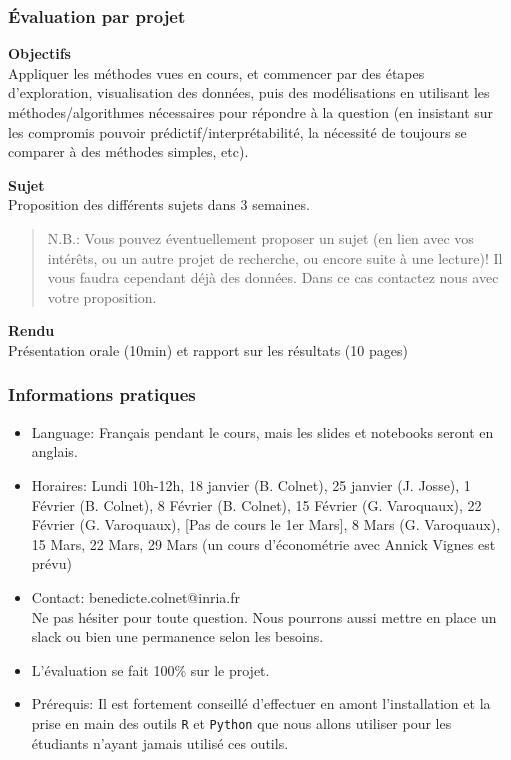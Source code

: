 \documentclass[10pt]{beamer}
\begin{document}
\frame
{ \frametitle{Évaluation par projet}

\textbf{Objectifs}\\
Appliquer les méthodes vues en cours, et commencer par des étapes d’exploration, visualisation des données, puis des modélisations en utilisant les méthodes/algorithmes nécessaires pour répondre à la question (en insistant sur les compromis pouvoir prédictif/interprétabilité, la nécessité de toujours se comparer à des méthodes simples, etc). 

\textbf{Sujet}\\
Proposition des différents sujets dans 3 semaines. 

\begin{quote}
N.B.: Vous pouvez éventuellement proposer un sujet (en lien avec vos intérêts, ou un autre projet de recherche, ou encore suite à une lecture)! Il vous faudra cependant déjà des données. Dans ce cas contactez nous avec votre proposition.
\end{quote}


\textbf{Rendu}\\
Présentation orale (10min) et rapport sur les résultats (10 pages)

}


\frame
{ \frametitle{Informations pratiques}

\begin{itemize}

\item Language: Français pendant le cours, mais les slides et notebooks seront en anglais.
\item Horaires: Lundi 10h-12h, 18 janvier (B. Colnet), 25 janvier (J. Josse), 1 Février (B. Colnet), 8 Février (B. Colnet),  15 Février (G. Varoquaux), 22 Février (G. Varoquaux), [Pas de cours le 1er Mars], 8 Mars (G. Varoquaux), 15 Mars, 22 Mars, 29 Mars (un cours d'économétrie avec Annick Vignes est prévu)
\item Contact: benedicte.colnet@inria.fr \\ Ne pas hésiter pour toute question. Nous pourrons aussi mettre en place un slack ou bien une permanence selon les besoins. 
\vfill

\item L'évaluation se fait 100\% sur le projet. 

\item Prérequis: Il est fortement conseillé d'effectuer en amont l'installation et la prise en main des outils \texttt{R} et \texttt{Python} que nous allons utiliser pour les étudiants n'ayant jamais utilisé ces outils. \\

\end{itemize}
}
\end{document}
